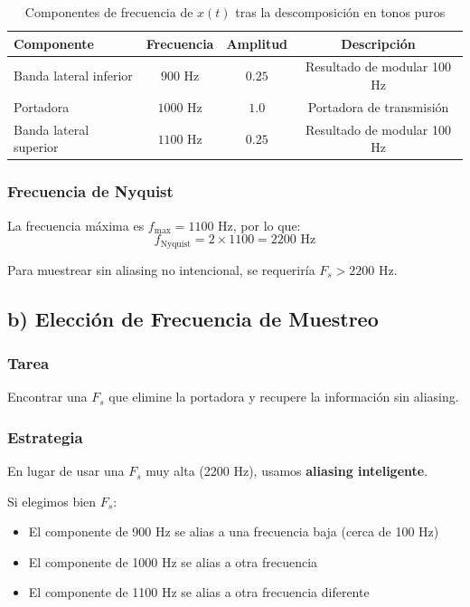 \documentclass[12pt]{article}
\begin{document}
\begin{table}[H]
\centering
\begin{tabular}{lccc}
\toprule
\textbf{Componente} & \textbf{Frecuencia} & \textbf{Amplitud} & \textbf{Descripción} \\
\midrule
Banda lateral inferior & $900$ Hz & $0.25$ & Resultado de modular 100 Hz \\
Portadora & $1000$ Hz & $1.0$ & Portadora de transmisión \\
Banda lateral superior & $1100$ Hz & $0.25$ & Resultado de modular 100 Hz \\
\bottomrule
\end{tabular}
\caption{Componentes de frecuencia de $x(t)$ tras la descomposición en tonos puros}
\end{table}

\subsubsection*{Frecuencia de Nyquist}

La frecuencia máxima es $f_{\max} = 1100$ Hz, por lo que:
\begin{equation}
f_{\text{Nyquist}} = 2 \times 1100 = 2200 \text{ Hz}
\end{equation}

Para muestrear sin aliasing no intencional, se requeriría $F_s > 2200$ Hz.

\subsection*{b) Elección de Frecuencia de Muestreo}

\subsubsection*{Tarea}
Encontrar una $F_s$ que elimine la portadora y recupere la información sin aliasing.

\subsubsection*{Estrategia}

En lugar de usar una $F_s$ muy alta (2200 Hz), usamos \textbf{aliasing inteligente}.

Si elegimos bien $F_s$:
\begin{itemize}
\item El componente de 900 Hz se alias a una frecuencia baja (cerca de 100 Hz)
\item El componente de 1000 Hz se alias a otra frecuencia
\item El componente de 1100 Hz se alias a otra frecuencia diferente
\end{itemize}
\end{document}
